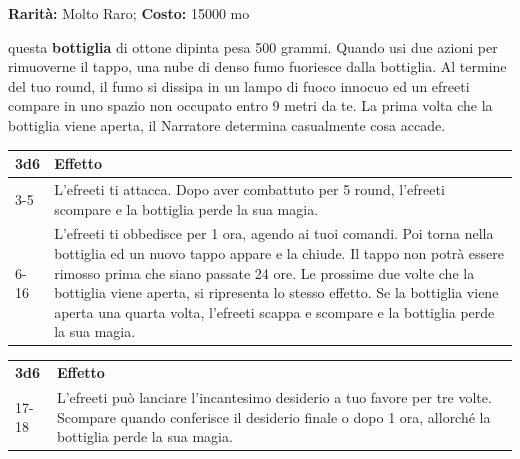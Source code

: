 \begin{multicols}{2}

\textbf{Rarità:} Molto Raro; \textbf{Costo:} 15000 mo

questa \textbf{bottiglia} di ottone dipinta pesa 500 grammi. Quando usi due azioni per rimuoverne il tappo, una nube di denso fumo fuoriesce dalla bottiglia. Al termine del tuo round, il fumo si dissipa in un lampo di fuoco innocuo ed un efreeti compare in uno spazio non occupato entro 9 metri da te. La prima volta che la bottiglia viene aperta, il Narratore determina casualmente cosa accade.

\medskip

\noindent\begin{tabularx}{\linewidth}{lX}
	\toprule
\rowcolor{gray!20}\textbf{3d6} &\textbf{Effetto}\\
\toprule
3-5 & L'efreeti ti attacca. Dopo aver combattuto per 5 round, l'efreeti scompare e la bottiglia perde la sua magia.\\
\rowcolor{gray!20}6-16 &L'efreeti ti obbedisce per 1 ora, agendo ai tuoi comandi. Poi torna nella bottiglia ed un nuovo tappo appare e la chiude. Il tappo non potrà essere rimosso prima che siano passate 24 ore. Le prossime due volte che la bottiglia viene aperta, si ripresenta lo stesso effetto. Se la bottiglia viene aperta una quarta volta, l'efreeti scappa e scompare e la bottiglia perde la sua magia.\\
\end{tabularx}
\noindent\begin{tabularx}{\linewidth}{lX}
\rowcolor{gray!20}\textbf{3d6} &\textbf{Effetto}\\

17-18 & L'efreeti può lanciare l'incantesimo desiderio a tuo favore per tre volte. Scompare quando conferisce il desiderio finale o dopo 1 ora, allorché la bottiglia perde la sua magia.
\end{tabularx}


\end{multicols}
